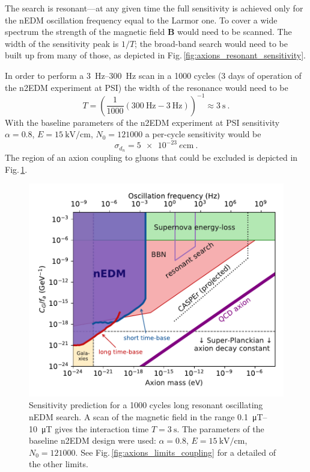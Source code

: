 The search is resonant---at any given time the full sensitivity is achieved only for the nEDM oscillation frequency equal to the Larmor one. To cover a wide spectrum the strength of the magnetic field $\mathbf{B}$ would need to be scanned. The width of the sensitivity peak is $1/T$; the broad-band search would need to be built up from many of those, as depicted in Fig.\,\ref{fig:axions_resonant_sensitivity}. 

In order to perform a \SIrange[range-phrase=--]{3}{300}{\hertz} scan in a 1000 cycles (3 days of operation of the n2EDM experiment at PSI) the width of the resonance would need to be
\begin{equation}
  T = {\left( \frac{1}{1000} \left( \SI{300}{\hertz} - \SI{3}{\hertz} \right)  \right)}^{-1} \approx \SI{3}{\second} \ .
\end{equation}
With the baseline parameters of the n2EDM experiment at PSI sensitivity $\alpha = 0.8$, $E = \SI{15}{\kilo\volt\per\centi\metre}$, $N_0 = \num{121000}$ a per-cycle sensitivity would be 
\begin{equation}
  \sigma_{d_n} = \SI{5e-23}{\elementarycharge\centi\metre} \ .
\end{equation}
The region of an axion coupling to gluons that could be excluded is depicted in Fig.\,\ref{fig:axions_prediction}.

\begin{figure}
  \centering
  \includegraphics[width=\linewidth]{gfx/axions/resonant_search_exclusion_1000cycles_n2EDM.pdf}
  \caption{Sensitivity prediction for a 1000 cycles long resonant oscillating nEDM search. A scan of the magnetic field in the range \SIrange[range-phrase=--]{0.1}{10}{\micro\tesla} gives the interaction time $T = \SI{3}{\second}$. The parameters of the baseline n2EDM design were used: $\alpha = 0.8$, $E = \SI{15}{\kilo\volt\per\centi\metre}$, $N_0 = \num{121000}$. See Fig.\,\ref{fig:axions_limits_coupling} for a detailed of the other limits.}\label{fig:axions_prediction}
\end{figure}

